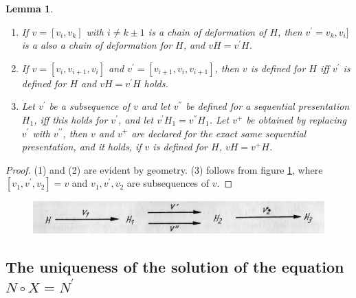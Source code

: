 \documentclass{article}
\newtheorem{lemma}{Lemma}
\begin{document}
\begin{lemma}
  \begin{enumerate}
    \item If $v = [v_i, v_k]$ with $i \neq k \pm 1$ is a chain of deformation of $H$, then $v^{\prime} = v_k, v_i]$ is a also a chain of deformation for $H$, and $vH =v^{\prime}H$.
    \item If $v = [v_i, v_{i+1}, v_i]$ and $v^{\prime}=[v_{i+1}, v_i, v_{i+1}]$, then $v$ is defined for $H$ iff $v^{\prime}$ is defined for $H$ and $vH = v^{\prime}H$ holds.
    \item Let $v^{\prime}$ be a subsequence of $v$ and let $v^{''}$ be defined for a sequential presentation $H_1$, iff this holds for $v^{\prime}$, and let $v^{\prime}H_1 = v^{''} H_1$. 
          Let $v^{+}$ be obtained by replacing $v^{\prime}$ with $v^{\prime \prime}$, then $v$ and $v^{+}$ are declared for the exact same sequential presentation, and it holds, 
          if $v$ is defined for $H$, $v H = v ^{+} H$.
  \end{enumerate}
\end{lemma}

\begin{proof}
  (1) and (2) are evident by geometry. (3) follows from figure \ref{fig:figure12}, where $[v_1, v^{\prime}, v_2] = v$ and $v_1, v^{\prime}, v_2$ are subsequences of $v$.
\end{proof}

\begin{figure}
\includegraphics[]{figure12.png}
  \centering
\caption{}
\label{fig:figure12}
\end{figure}

\subsection{The uniqueness of the solution of the equation $N\circ X= N^{\prime}$}
\end{document}
